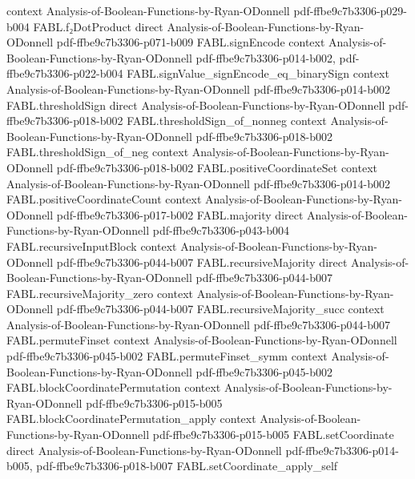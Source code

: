 \begin{theorem}
  {context}
  {Analysis-of-Boolean-Functions-by-Ryan-ODonnell}
  {pdf-ffbe9c7b3306-p029-b004}
\proofstep
  {FABL.f₂DotProduct}
  {direct}
  {Analysis-of-Boolean-Functions-by-Ryan-ODonnell}
  {pdf-ffbe9c7b3306-p071-b009}
\proofstep
  {FABL.signEncode}
  {context}
  {Analysis-of-Boolean-Functions-by-Ryan-ODonnell}
  {pdf-ffbe9c7b3306-p014-b002,
    pdf-ffbe9c7b3306-p022-b004}
\proofstep
  {FABL.signValue_signEncode_eq_binarySign}
  {context}
  {Analysis-of-Boolean-Functions-by-Ryan-ODonnell}
  {pdf-ffbe9c7b3306-p014-b002}
\proofstep
  {FABL.thresholdSign}
  {direct}
  {Analysis-of-Boolean-Functions-by-Ryan-ODonnell}
  {pdf-ffbe9c7b3306-p018-b002}
\proofstep
  {FABL.thresholdSign_of_nonneg}
  {context}
  {Analysis-of-Boolean-Functions-by-Ryan-ODonnell}
  {pdf-ffbe9c7b3306-p018-b002}
\proofstep
  {FABL.thresholdSign_of_neg}
  {context}
  {Analysis-of-Boolean-Functions-by-Ryan-ODonnell}
  {pdf-ffbe9c7b3306-p018-b002}
\proofstep
  {FABL.positiveCoordinateSet}
  {context}
  {Analysis-of-Boolean-Functions-by-Ryan-ODonnell}
  {pdf-ffbe9c7b3306-p014-b002}
\proofstep
  {FABL.positiveCoordinateCount}
  {context}
  {Analysis-of-Boolean-Functions-by-Ryan-ODonnell}
  {pdf-ffbe9c7b3306-p017-b002}
\proofstep
  {FABL.majority}
  {direct}
  {Analysis-of-Boolean-Functions-by-Ryan-ODonnell}
  {pdf-ffbe9c7b3306-p043-b004}
\proofstep
  {FABL.recursiveInputBlock}
  {context}
  {Analysis-of-Boolean-Functions-by-Ryan-ODonnell}
  {pdf-ffbe9c7b3306-p044-b007}
\proofstep
  {FABL.recursiveMajority}
  {direct}
  {Analysis-of-Boolean-Functions-by-Ryan-ODonnell}
  {pdf-ffbe9c7b3306-p044-b007}
\proofstep
  {FABL.recursiveMajority_zero}
  {context}
  {Analysis-of-Boolean-Functions-by-Ryan-ODonnell}
  {pdf-ffbe9c7b3306-p044-b007}
\proofstep
  {FABL.recursiveMajority_succ}
  {context}
  {Analysis-of-Boolean-Functions-by-Ryan-ODonnell}
  {pdf-ffbe9c7b3306-p044-b007}
\proofstep
  {FABL.permuteFinset}
  {context}
  {Analysis-of-Boolean-Functions-by-Ryan-ODonnell}
  {pdf-ffbe9c7b3306-p045-b002}
\proofstep
  {FABL.permuteFinset_symm}
  {context}
  {Analysis-of-Boolean-Functions-by-Ryan-ODonnell}
  {pdf-ffbe9c7b3306-p045-b002}
\proofstep
  {FABL.blockCoordinatePermutation}
  {context}
  {Analysis-of-Boolean-Functions-by-Ryan-ODonnell}
  {pdf-ffbe9c7b3306-p015-b005}
\proofstep
  {FABL.blockCoordinatePermutation_apply}
  {context}
  {Analysis-of-Boolean-Functions-by-Ryan-ODonnell}
  {pdf-ffbe9c7b3306-p015-b005}
\proofstep
  {FABL.setCoordinate}
  {direct}
  {Analysis-of-Boolean-Functions-by-Ryan-ODonnell}
  {pdf-ffbe9c7b3306-p014-b005,
    pdf-ffbe9c7b3306-p018-b007}
\proofstep
  {FABL.setCoordinate_apply_self}

\end{theorem}
